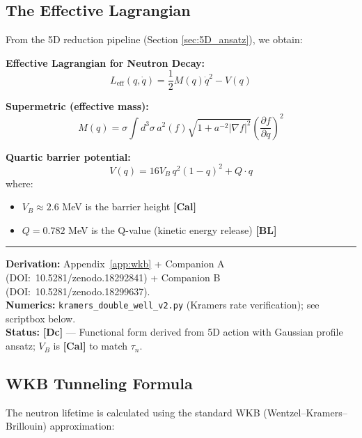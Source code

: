\documentclass[11pt,a4paper]{article}
\newcommand{\tagDc}{\textcolor{blue!70!black}{\textbf{[Dc]}}}
\newcommand{\tagCal}{\textcolor{purple!70!black}{\textbf{[Cal]}}}
\newcommand{\tagBL}{\textcolor{gray!70!black}{\textbf{[BL]}}}
\begin{document}
\subsection{The Effective Lagrangian}

From the 5D reduction pipeline (Section \ref{sec:5D_ansatz}), we obtain:

\begin{resultbox}
\textbf{Effective Lagrangian for Neutron Decay:}
\begin{equation}
    L_{\text{eff}}(q, \dot{q}) = \frac{1}{2} M(q) \dot{q}^2 - V(q)
    \label{eq:L_eff_neutron}
\end{equation}

\textbf{Supermetric (effective mass):}
\begin{equation}
    M(q) = \sigma \int d^3\sigma \, a^2(f) \sqrt{1 + a^{-2}|\nabla f|^2} \left( \frac{\partial f}{\partial q} \right)^2
    \label{eq:supermetric}
\end{equation}

\textbf{Quartic barrier potential:}
\begin{equation}
    V(q) = 16 V_B \, q^2 (1-q)^2 + Q \cdot q
    \label{eq:quartic_potential}
\end{equation}
where:
\begin{itemize}[nosep]
    \item $V_B \approx 2.6$ MeV is the barrier height \tagCal{}
    \item $Q = 0.782$ MeV is the Q-value (kinetic energy release) \tagBL{}
\end{itemize}

\vspace{0.3em}\hrule\vspace{0.3em}
\textbf{Derivation:} Appendix~\ref{app:wkb} + Companion A (DOI:~10.5281/zenodo.18292841) + Companion B (DOI:~10.5281/zenodo.18299637).\\
\textbf{Numerics:} \texttt{kramers\_double\_well\_v2.py} (Kramers rate verification); see scriptbox below.\\
\textbf{Status:} \tagDc{} --- Functional form derived from 5D action with Gaussian profile ansatz; $V_B$ is \tagCal{} to match $\tau_n$.
\end{resultbox}

\subsection{WKB Tunneling Formula}

The neutron lifetime is calculated using the standard WKB (Wentzel--Kramers--Brillouin) approximation:
\end{document}
